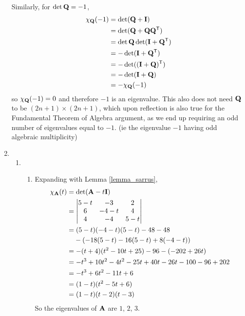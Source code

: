 \documentclass[fleqn,a4paper,11pt]{article}
\begin{document}
\begin{enumerate}[label=\textbf{\arabic*.}]
   Similarly, for \(\det \mathbf{Q} = -1\),
   \begin{align*}
    \chi_{\mathbf{Q}}(-1)
     &= \det(\mathbf{Q} + \mathbf{I}) \\
     &= \det(\mathbf{Q} + \mathbf{Q} \mathbf{Q}^{\mathsf T}) \\
     &= \det \mathbf{Q}\det(\mathbf{I} + \mathbf{Q}^{\mathsf T}) \\
     &= -\det(\mathbf{I} + \mathbf{Q}^{\mathsf T}) \\
     &= -\det((\mathbf{I} + \mathbf{Q})^{\mathsf T}) \\
     &= -\det(\mathbf{I} + \mathbf{Q}) \\
     &= -\chi_{\mathbf{Q}}(-1)
   \end{align*}
   so \(\chi_{\mathbf{Q}}(-1) = 0\) and therefore \(-1\) is an eigenvalue. This also
   does not need \(\mathbf{Q}\) to be \((2n + 1) \times (2n + 1)\), which upon
   reflection is also true for the Fundamental Theorem of Algebra argument, as
   we end up requiring an odd number of eigenvalues equal to \(-1\). (ie the
   eigenvalue \(-1\) having odd algebraic multiplicity)
  \item
   \begin{enumerate}[label=(\textbf{\Alph*})]
    \item
     \begin{enumerate}[label=(\roman*)]
      \item Expanding with Lemma \ref{lemma_sarrus},
       \begin{align*}
        \chi_{\mat A}(t)
         &= \det(\mat A - t \mat I) \\
         &= \begin{vmatrix}
          5 - t & -3 & 2 \\
          6 & -4 - t & 4 \\
          4 & -4 & 5 - t
         \end{vmatrix} \\
        &= (5 - t)(-4 - t)(5 - t) - 48 - 48 \\
        &\phantom{={}} - (-18(5 - t) - 16(5 - t) + 8(-4 - t)) \\
        &= -(t + 4)(t^2 - 10t + 25) - 96 - (-202 + 26t) \\
        &= -t^3 + 10t^2 - 4t^2 - 25t + 40t - 26t - 100 - 96 + 202 \\
        &= -t^3 + 6t^2 - 11t + 6 \\
        &= (1 - t)(t^2 - 5t + 6) \\
        &= (1 - t)(t - 2)(t - 3)
       \end{align*}
       So the eigenvalues of \(\mathbf{A}\) are \(1\), \(2\), \(3\).

\end{enumerate}
\end{enumerate}
\end{enumerate}
\end{document}
